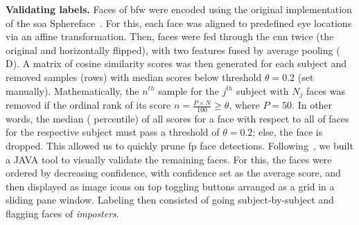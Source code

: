 \vspace{1mm}
\noindent\textbf{Validating labels.} 
Faces of \gls{bfw} were encoded using the original implementation of the \gls{soa} Sphereface~\cite{liu2017sphereface}. For this, each face was aligned to predefined eye locations via an affine transformation. Then, faces were fed through the \gls{cnn} twice (\ie the original and horizontally flipped), with two features fused by average pooling ( D). A matrix of cosine similarity scores was then generated for each subject and removed samples (\ie rows) with median scores below threshold $\theta=0.2$ (set manually). Mathematically, the $n^{th}$ sample for the $j^{th}$ subject with $N_j$ faces was removed if the ordinal rank of its score $n = \frac{P\times N}{100}\geq\theta$, where $P=50$. In other words, the median ( percentile) of all scores for a face with respect to all of faces for the respective subject must pass a threshold of $\theta=0.2$; else, the face is dropped. This allowed us to quickly prune \gls{fp} face detections. Following~\cite{robinson2016families, robinson2018visual}, we built a JAVA tool to visually validate the remaining faces. For this, the faces were ordered by decreasing confidence, with confidence set as the average score, and then displayed as image icons on top toggling buttons arranged as a grid in a sliding pane window. Labeling then consisted of going subject-by-subject and flagging faces of \emph{imposters}.

